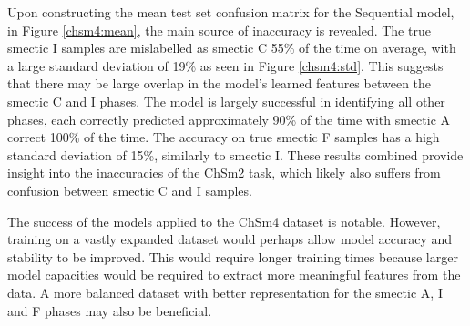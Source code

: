 \documentclass[12pt]{article}
\begin{document}
Upon constructing the mean test set confusion matrix for the Sequential model, in Figure \ref{chsm4:mean}, the main source of inaccuracy is revealed. The true smectic I samples are mislabelled as smectic C 55\% of the time on average, with a large standard deviation of 19\% as seen in Figure \ref{chsm4:std}. This suggests that there may be large overlap in the model's learned features between the smectic C and I phases. The model is largely successful in identifying all other phases, each correctly predicted approximately 90\% of the time with smectic A correct 100\% of the time. The accuracy on true smectic F samples has a high standard deviation of 15\%, similarly to smectic I. These results combined provide insight into the inaccuracies of the ChSm2 task, which likely also suffers from confusion between smectic C and I samples.

The success of the models applied to the ChSm4 dataset is notable. However, training on a vastly expanded dataset would perhaps allow model accuracy and stability to be improved. This would require longer training times because larger model capacities would be required to extract more meaningful features from the data. A more balanced dataset with better representation for the smectic A, I and F phases may also be beneficial.
\end{document}
